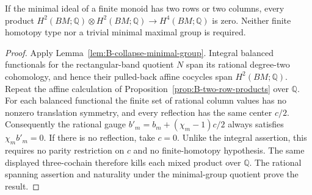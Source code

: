 \begin{corollary}\label{cor:B-two-row-general}
If the minimal ideal of a finite monoid has two rows or two columns,
every product
$H^2(BM;\mathbb Q)\otimes H^2(BM;\mathbb Q)\to H^4(BM;\mathbb Q)$
is zero.  Neither finite homotopy type nor a trivial minimal maximal
group is required.
\end{corollary}
\begin{proof}
Apply Lemma~\ref{lem:B-collapse-minimal-group}.  Integral balanced
functionals for the rectangular-band quotient $N$ span its rational
degree-two cohomology, and hence their pulled-back affine cocycles
span $H^2(BM;\mathbb Q)$.
Repeat the affine calculation of
Proposition~\ref{prop:B-two-row-products} over $\mathbb Q$.
For each balanced functional the finite set of rational column
values has no nonzero translation symmetry, and every reflection
has the same center $c/2$.  Consequently the rational gauge
$b'_m=b_m+(\chi_m-1)c/2$ always satisfies $\chi_m b'_m=0$.
If there is no reflection, take $c=0$.
Unlike the integral assertion, this requires no parity restriction
on $c$ and no finite-homotopy hypothesis.  The same displayed
three-cochain therefore kills each mixed product over $\mathbb Q$.
The rational spanning assertion and naturality under the
minimal-group quotient prove the result.
\end{proof}








